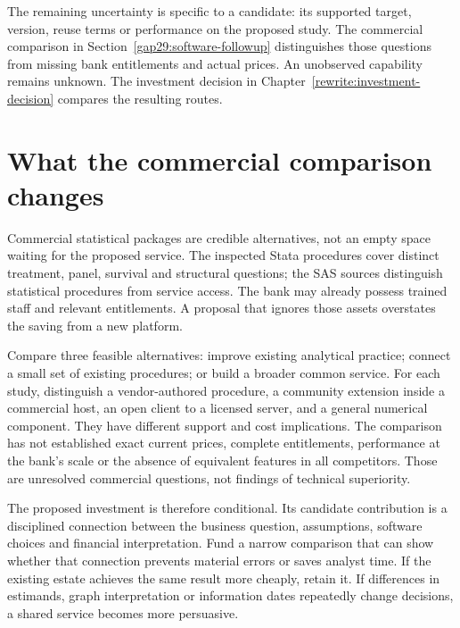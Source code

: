 The remaining uncertainty is specific to a candidate: its supported target,
version, reuse terms or performance on the proposed study. The commercial
comparison in Section~\ref{gap29:software-followup} distinguishes those
questions from missing bank entitlements and actual prices. An unobserved
capability remains unknown. The investment decision in
Chapter~\ref{rewrite:investment-decision} compares the resulting routes.




\section{What the commercial comparison changes}
Commercial statistical packages are credible alternatives, not an empty space
waiting for the proposed service. The inspected Stata procedures cover distinct
treatment, panel, survival and structural questions; the SAS sources distinguish
statistical procedures from service access. The bank may already possess
trained staff and relevant entitlements. A proposal that ignores those assets
overstates the saving from a new platform.
\citep{exec13_ci_stata_causal_intro,exec18_gp_stata_xthdid,
exec14_survival_stata,exec13_ivrd_sas,exec23_workflow_sasctl}

Compare three feasible alternatives: improve existing analytical practice;
connect a small set of existing procedures; or build a broader common service.
For each study, distinguish a vendor-authored procedure, a community extension
inside a commercial host, an open client to a licensed server, and a general
numerical component. They have different support and cost implications. The
comparison has not established exact current prices, complete entitlements,
performance at the bank's scale or the absence of equivalent features in all
competitors. Those are unresolved commercial questions, not findings of
technical superiority.

The proposed investment is therefore conditional. Its candidate contribution
is a disciplined connection between the business question, assumptions,
software choices and financial interpretation. Fund a narrow comparison that
can show whether that connection prevents material errors or saves analyst
time. If the existing estate achieves the same result more cheaply, retain it.
If differences in estimands, graph interpretation or information dates repeatedly
change decisions, a shared service becomes more persuasive.



